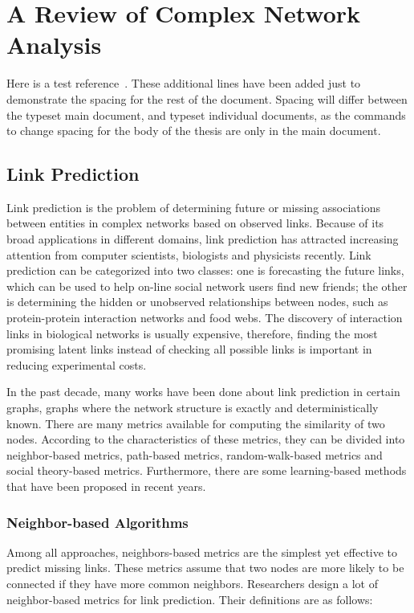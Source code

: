 \documentclass[\main/thesis.tex]{subfiles}
\begin{document}
\chapter{A Review of Complex Network Analysis}

Here is a test reference~\cite{Knuth68:art_of_programming}.
These additional lines have been added just to demonstrate the spacing
for the rest of the document. Spacing will differ between the typeset main
document, and typeset individual documents, as the commands
to change spacing for the body of the thesis are only in the main document.

\section{Link Prediction}\label{previous:link-prediction}
Link prediction is the problem of determining future or missing associations between entities in complex networks based on observed links. Because of its broad applications in different domains, link prediction has attracted increasing attention from computer scientists, biologists and physicists recently. Link prediction can be categorized into two classes: one is forecasting the future links, which can be used to help on-line social network users find new friends; the other is determining the hidden or unobserved relationships between nodes, such as protein-protein interaction networks and food webs. The discovery of interaction links in biological networks is usually expensive, therefore, finding the most promising latent links instead of checking all possible links is important in reducing experimental costs.

In the past decade, many works have been done about link prediction in certain graphs, graphs where the network structure is exactly and deterministically known. There are many metrics available for computing the similarity of two nodes. According to the characteristics of these metrics, they can be divided into neighbor-based metrics, path-based metrics, random-walk-based metrics and social theory-based metrics. Furthermore, there are some learning-based methods that have been proposed in recent years.
\subsection{Neighbor-based Algorithms}

Among all approaches, neighbors-based metrics are the simplest yet effective to predict missing links. These metrics assume that two nodes are more likely to be connected if they have more common neighbors. Researchers design a lot of neighbor-based metrics for link prediction. Their definitions are as follows:
\end{document}
